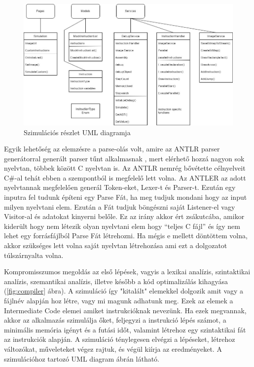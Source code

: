 \begin{figure}[h]
\centering
\includegraphics[scale=0.4]{images/SimUML.jpg}
\caption{Szimulációs részlet UML diagramja}
\label{fig:simUML}
\end{figure}

Egyik lehetőség az elemzésre a parse-olás volt, amire az ANTLR parser generátorral generált parser tűnt alkalmasnak \cite{antlr}, mert elérhető hozzá nagyon sok nyelvtan, többek között C nyelvtan is. Az ANTLR nemrég bővétette célnyelveit C{\#}-al tehát ebben a szempontból is megfelelő lett volna. Az ANTLER az adott nyelvtannak megfelelően generál Token-eket, Lexer-t és Parser-t. Ezután egy inputra fel tudunk építeni egy Parse Fát, ha meg tudjuk mondani hogy az input milyen nyelvtani elem. Ezután a Fát tudjuk böngészni saját Listener-el vagy Visitor-al és adatokat kinyerni belőle. Ez az irány akkor ért zsákutcába, amikor kiderült hogy nem létezik olyan nyelvtani elem hogy “teljes C fájl” és így nem lehet egy forrásfájlból Parse Fát létrehozni. Ha mégis e mellett döntöttem volna, akkor szükséges lett volna saját nyelvtan létrehozása ami ezt a dolgozatot túlszárnyalta volna.

Kompromisszumos megoldás az első lépések, vagyis a lexikai analízis, szintaktikai analízis, szemantikai analízis, illetve később a kód optimalizálás kihagyása (\ref{fig:compiler} ábra). A szimuláció így "kitalált" elemekkel dolgozik amit vagy a fájlnév alapján hoz létre, vagy mi magunk adhatunk meg. Ezek az elemek a Intermediate Code elemei amiket instrukcióknak nevezünk. Ha ezek megvannak, akkor az alkalmazás szimulálja őket, feljegyzi a instrukció lépés számot, a minimális memória igényt és a futási időt, valamint létrehoz egy szintaktikai fát az instrukciók alapján. A szimuláció ténylegesen elvégzi a lépéseket, létrehoz változókat, műveleteket végez rajtuk, és végül kiírja az eredményeket. A szimulációhoz tartozó UML diagram  ábrán látható.



